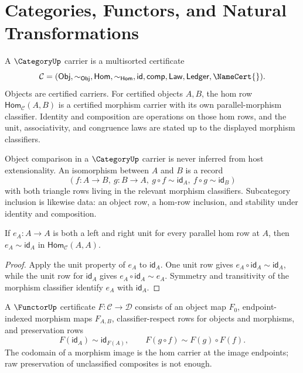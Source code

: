 \section{Categories, Functors, and Natural Transformations}
\label{sec:geometry-spine-category}

\begin{definition}
\label{def:geometry-spine-category-carrier}
A $\CategoryUp$ carrier is a multisorted certificate
$$
\mathcal C=
(\mathsf{Obj},\sim_{\mathsf{Obj}},
\mathsf{Hom},\sim_{\mathsf{Hom}},
\mathsf{id},\mathsf{comp},\mathsf{Law},\mathsf{Ledger},\NameCert{}).
$$
Objects are certified carriers.  For certified objects $A,B$, the hom row
$\mathsf{Hom}_{\mathcal C}(A,B)$ is a certified morphism carrier with its own
parallel-morphism classifier.  Identity and composition are operations on
those hom rows, and the unit, associativity, and congruence laws are stated up
to the displayed morphism classifiers.
\end{definition}

\begin{definition}
\label{def:geometry-spine-isomorphism-record}
Object comparison in a $\CategoryUp$ carrier is never inferred from host
extensionality.  An isomorphism between $A$ and $B$ is a record
$$
(f:A\to B,\ g:B\to A,\ g\circ f\sim\mathsf{id}_A,\ f\circ g\sim\mathsf{id}_B)
$$
with both triangle rows living in the relevant morphism classifiers.
Subcategory inclusion is likewise data: an object row, a hom-row inclusion,
and stability under identity and composition.
\end{definition}

\begin{theorem}
\label{thm:geometry-spine-identity-uniqueness}
If $e_A:A\to A$ is both a left and right unit for every parallel hom row at
$A$, then $e_A\sim\mathsf{id}_A$ in $\mathsf{Hom}_{\mathcal C}(A,A)$.
\end{theorem}

\begin{proof}
Apply the unit property of $e_A$ to $\mathsf{id}_A$.  One unit row gives
$e_A\circ\mathsf{id}_A\sim\mathsf{id}_A$, while the unit row for
$\mathsf{id}_A$ gives $e_A\circ\mathsf{id}_A\sim e_A$.  Symmetry and
transitivity of the morphism classifier identify $e_A$ with
$\mathsf{id}_A$.
\end{proof}

\begin{definition}
\label{def:geometry-spine-functor}
A $\FunctorUp$ certificate $F:\mathcal C\to\mathcal D$ consists of an object
map $F_0$, endpoint-indexed morphism maps $F_{A,B}$, classifier-respect rows
for objects and morphisms, and preservation rows
$$
F(\mathsf{id}_A)\sim\mathsf{id}_{F(A)},
\qquad
F(g\circ f)\sim F(g)\circ F(f).
$$
The codomain of a morphism image is the hom carrier at the image endpoints;
raw preservation of unclassified composites is not enough.
\end{definition}

